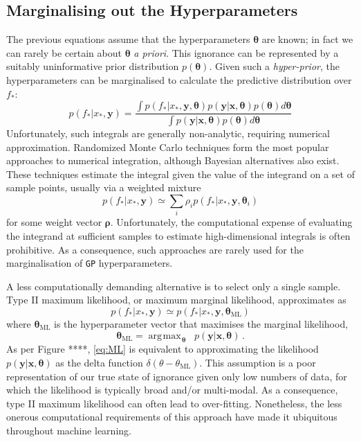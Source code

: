 \documentclass{article}
\newcommand{\xd}{\mathbf{x}}
\newcommand{\yd}{\mathbf{y}}
\DeclareMathOperator*{\argmax}{\arg\!\max\!}
\begin{document}
\subsection{Marginalising out the Hyperparameters}
The previous equations assume that the hyperparameters $\bm{\theta}$ are known; in fact we can rarely be certain about $\bm{\theta}$ \emph{a priori}. This ignorance can be represented by a suitably uninformative prior distribution $p(\bm{\theta})$. Given such a \emph{hyper-prior}, the hyperparameters can be marginalised to calculate the predictive distribution over $f_*$:
\begin{equation}\label{fullmargint}
p(f_* |x_*, \yd) = \frac{\int p(f_* | x_*, \yd,\bm{\theta})p(\yd|\xd,\bm{\theta})p(\bm{\theta})d\bm{\theta}}{\int p(\yd|\xd,\bm{\theta})p(\bm{\theta})d\bm{\theta}}
\end{equation}
Unfortunately, such integrals are generally non-analytic, requiring numerical approximation. Randomized Monte Carlo techniques \cite{chen2000monte} form the most popular approaches to numerical integration, although Bayesian alternatives \cite{bayesquad, osbornebayesquad} also exist. 
These techniques estimate the integral given
the value of the integrand on a set of sample points, usually via a weighted mixture
\begin{equation}\label{sampling}
p(f_* |x_*, \yd) \simeq \sum_i \rho_i p(f_* | x_*, \yd,\bm{\theta}_i)
\end{equation}
for some weight vector $\bm{\rho}$. Unfortunately, the computational expense of evaluating the integrand at sufficient samples to estimate high-dimensional integrals is often prohibitive. As a consequence, such approaches are rarely used for the marginalisation of \verb"GP" hyperparameters. 

A less computationally demanding alternative is to select only a single sample. Type II maximum likelihood, or maximum marginal likelihood, approximates as
\begin{equation} \label{eq:ML}
p(f_* |x_*, \yd) \simeq p(f_* | x_*, \yd,\bm{\theta}_{\mathrm{ML}})
\end{equation}
where $\bm{\theta}_{\mathrm{ML}}$ is the hyperparameter vector that maximises the marginal likelihood, 
\begin{equation}
\bm{\theta}_{\mathrm{ML}} = \argmax_{\bm{\theta}} \;\; p(\yd|\xd,\bm{\theta})\,.
\end{equation}
As per Figure ****, \eqref{eq:ML} is equivalent to approximating the likelihood $p(\yd|\xd,\bm{\theta})$ as the delta function $\delta(\theta - \theta_{\mathrm{ML}})$. This assumption is a poor representation of our true state of ignorance given only low numbers of data, for which the likelihood is typically broad and/or multi-modal. As a consequence, type II maximum likelihood can often lead to over-fitting. Nonetheless, the less onerous computational requirements of this approach have made it ubiquitous throughout machine learning. 
\end{document}
